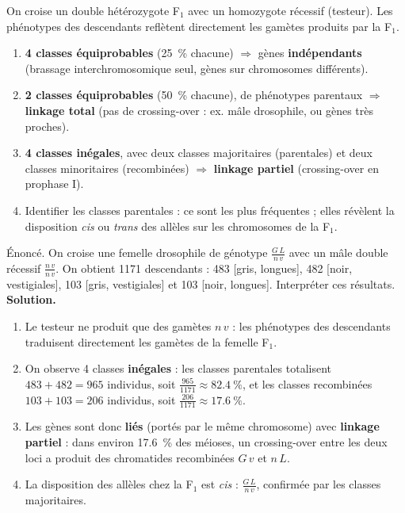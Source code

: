 \documentclass[11pt]{article}
\begin{document}
\begin{methode}
On croise un double hétérozygote F$_1$ avec un homozygote récessif (testeur). Les phénotypes des descendants reflètent directement les gamètes produits par la F$_1$.
\begin{enumerate}
\item \textbf{4 classes équiprobables} (\SI{25}{\percent} chacune) $\Rightarrow$ gènes \textbf{indépendants} (brassage interchromosomique seul, gènes sur chromosomes différents).
\item \textbf{2 classes équiprobables} (\SI{50}{\percent} chacune), de phénotypes parentaux $\Rightarrow$ \textbf{linkage total} (pas de crossing-over : ex. mâle drosophile, ou gènes très proches).
\item \textbf{4 classes inégales}, avec deux classes majoritaires (parentales) et deux classes minoritaires (recombinées) $\Rightarrow$ \textbf{linkage partiel} (crossing-over en prophase I).
\item Identifier les classes parentales : ce sont les plus fréquentes ; elles révèlent la disposition \emph{cis} ou \emph{trans} des allèles sur les chromosomes de la F$_1$.
\end{enumerate}
\end{methode}

\begin{exoresolu}
Énoncé. On croise une femelle drosophile de génotype $\frac{G\,L}{n\,v}$ avec un mâle double récessif $\frac{n\,v}{n\,v}$. On obtient 1171 descendants : 483 [gris, longues], 482 [noir, vestigiales], 103 [gris, vestigiales] et 103 [noir, longues]. Interpréter ces résultats.
\tcblower
\textbf{Solution.}
\begin{enumerate}
\item Le testeur ne produit que des gamètes $n\,v$ : les phénotypes des descendants traduisent directement les gamètes de la femelle F$_1$.
\item On observe 4 classes \textbf{inégales} : les classes parentales totalisent $483+482=965$ individus, soit $\frac{965}{1171}\approx\SI{82,4}{\percent}$, et les classes recombinées $103+103=206$ individus, soit $\frac{206}{1171}\approx\SI{17,6}{\percent}$.
\item Les gènes sont donc \textbf{liés} (portés par le même chromosome) avec \textbf{linkage partiel} : dans environ \SI{17,6}{\percent} des méioses, un crossing-over entre les deux loci a produit des chromatides recombinées $G\,v$ et $n\,L$.
\item La disposition des allèles chez la F$_1$ est \emph{cis} : $\frac{G\,L}{n\,v}$, confirmée par les classes majoritaires.
\end{enumerate}
\end{exoresolu}
\end{document}
